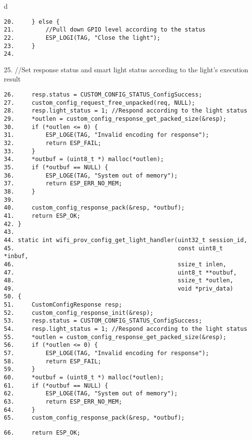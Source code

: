 \documentclass[a4paper,12pt]{book}
\begin{document}
\begin{codebloc}
\begin{tabular}{d}
\vspace{2pt}
\begin{verbatim}
20.     } else {
21.         //Pull down GPIO level according to the status
22.         ESP_LOGI(TAG, "Close the light");
23.     }
24.	
\end{verbatim}
25. \fontsize{8.5pt}{10pt}\selectfont//Set response status and smart light status according to the light’s execution result
\footnotesize
\begin{verbatim}
26.     resp.status = CUSTOM_CONFIG_STATUS_ConfigSuccess;
27.     custom_config_request_free_unpacked(req, NULL);
28.     resp.light_status = 1; //Respond according to the light status
29.     *outlen = custom_config_response_get_packed_size(&resp);
30.     if (*outlen <= 0) {
31.         ESP_LOGE(TAG, "Invalid encoding for response");
32.         return ESP_FAIL;
33.     }
34.     *outbuf = (uint8_t *) malloc(*outlen);
35.     if (*outbuf == NULL) {
36.         ESP_LOGE(TAG, "System out of memory");
37.         return ESP_ERR_NO_MEM;
38.     }
39.	
40.     custom_config_response_pack(&resp, *outbuf);
41.     return ESP_OK;
42. }
43.	
44. static int wifi_prov_config_get_light_handler(uint32_t session_id,
45.                                               const uint8_t *inbuf,
46.                                               ssize_t inlen,
47.                                               uint8_t **outbuf,
48.                                               ssize_t *outlen,
49.                                               void *priv_data)
50. {
51.     CustomConfigResponse resp;
52.     custom_config_response_init(&resp);
53.     resp.status = CUSTOM_CONFIG_STATUS_ConfigSuccess;
54.     resp.light_status = 1; //Respond according to the light status
55.     *outlen = custom_config_response_get_packed_size(&resp);
56.     if (*outlen <= 0) {
57.         ESP_LOGE(TAG, "Invalid encoding for response");
58.         return ESP_FAIL;
59.     }
60.     *outbuf = (uint8_t *) malloc(*outlen);
61.     if (*outbuf == NULL) {
62.         ESP_LOGE(TAG, "System out of memory");
63.         return ESP_ERR_NO_MEM;
64.     }
65.     custom_config_response_pack(&resp, *outbuf);
\end{verbatim}
\verb|66.     return ESP_OK;|
\end{tabular}
\end{codebloc}
\end{document}
